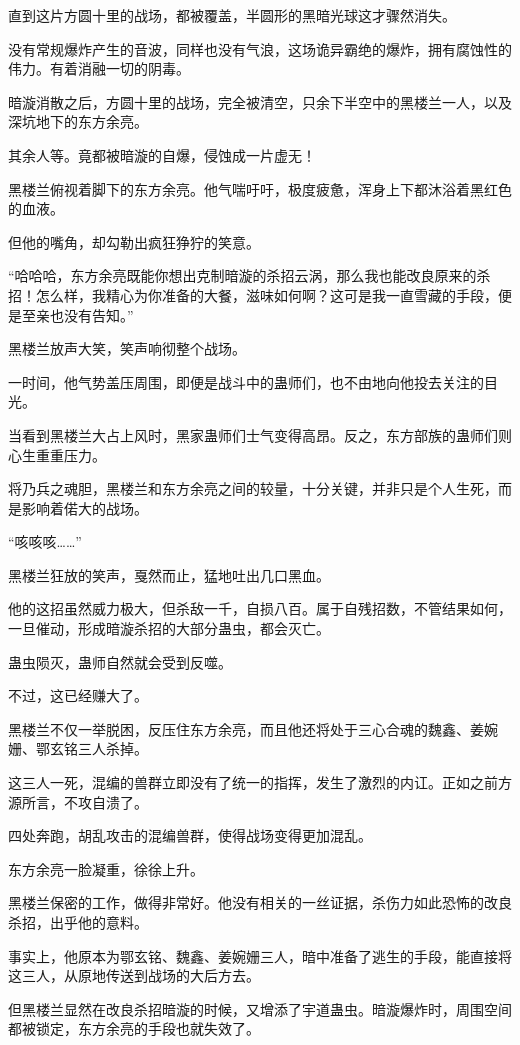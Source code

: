\begin{this_body}
直到这片方圆十里的战场，都被覆盖，半圆形的黑暗光球这才骤然消失。

没有常规爆炸产生的音波，同样也没有气浪，这场诡异霸绝的爆炸，拥有腐蚀性的伟力。有着消融一切的阴毒。

暗漩消散之后，方圆十里的战场，完全被清空，只余下半空中的黑楼兰一人，以及深坑地下的东方余亮。

其余人等。竟都被暗漩的自爆，侵蚀成一片虚无！

黑楼兰俯视着脚下的东方余亮。他气喘吁吁，极度疲惫，浑身上下都沐浴着黑红色的血液。

但他的嘴角，却勾勒出疯狂狰狞的笑意。

“哈哈哈，东方余亮既能你想出克制暗漩的杀招云涡，那么我也能改良原来的杀招！怎么样，我精心为你准备的大餐，滋味如何啊？这可是我一直雪藏的手段，便是至亲也没有告知。”

黑楼兰放声大笑，笑声响彻整个战场。

一时间，他气势盖压周围，即便是战斗中的蛊师们，也不由地向他投去关注的目光。

当看到黑楼兰大占上风时，黑家蛊师们士气变得高昂。反之，东方部族的蛊师们则心生重重压力。

将乃兵之魂胆，黑楼兰和东方余亮之间的较量，十分关键，并非只是个人生死，而是影响着偌大的战场。

“咳咳咳……”

黑楼兰狂放的笑声，戛然而止，猛地吐出几口黑血。

他的这招虽然威力极大，但杀敌一千，自损八百。属于自残招数，不管结果如何，一旦催动，形成暗漩杀招的大部分蛊虫，都会灭亡。

蛊虫陨灭，蛊师自然就会受到反噬。

不过，这已经赚大了。

黑楼兰不仅一举脱困，反压住东方余亮，而且他还将处于三心合魂的魏鑫、姜婉姗、鄂玄铭三人杀掉。

这三人一死，混编的兽群立即没有了统一的指挥，发生了激烈的内讧。正如之前方源所言，不攻自溃了。

四处奔跑，胡乱攻击的混编兽群，使得战场变得更加混乱。

东方余亮一脸凝重，徐徐上升。

黑楼兰保密的工作，做得非常好。他没有相关的一丝证据，杀伤力如此恐怖的改良杀招，出乎他的意料。

事实上，他原本为鄂玄铭、魏鑫、姜婉姗三人，暗中准备了逃生的手段，能直接将这三人，从原地传送到战场的大后方去。

但黑楼兰显然在改良杀招暗漩的时候，又增添了宇道蛊虫。暗漩爆炸时，周围空间都被锁定，东方余亮的手段也就失效了。


\end{this_body}
